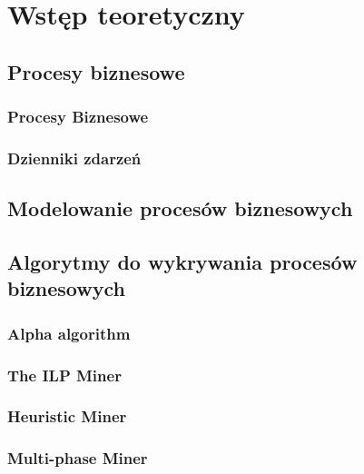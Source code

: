 \chapter{Wstęp teoretyczny}
\label{cha:wstepTeoretyczny}


\section{Procesy biznesowe}
\label{sec:procesyBiznesowe}
\subsection{Procesy Biznesowe}
\subsection{Dzienniki zdarzeń}


\section{Modelowanie procesów biznesowych}
\label{sec:modelowanie}


\section{Algorytmy do wykrywania procesów biznesowych}
\label{sec:algorytmy}
\subsection{Alpha algorithm}
\subsection{The ILP Miner}
\subsection{Heuristic Miner}
\subsection{Multi-phase Miner}


